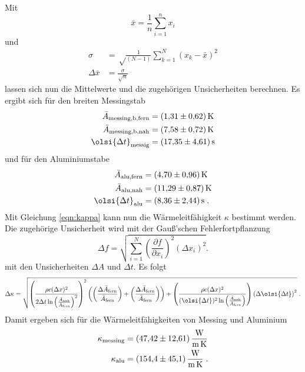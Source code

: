 \noindent
Mit 
\begin{equation}
  \bar{x}=\frac{1}{n}\sum_{i=1}^n{x_i}
  \label{eqn:Mittelwert}
\end{equation}
und 
\begin{align}
  \sigma&=\sqrt\frac{1}{(N-1)}\sum_{k=1}^N\!(x_k-\bar{x})^2 \label{eqn:Standardabweichung}\\
  \Delta\bar{x}&=\frac{\sigma}{\sqrt{n}} \label{eqn:Standardfehler}
\end{align}
lassen sich nun die Mittelwerte und die zugehörigen Unsicherheiten berechnen. Es ergibt sich für den breiten Messingstab
\begin{align*}
  \bar{A}_\text{messing,b,fern} &=\SI{1.31 \pm 0.62}{\kelvin}\\
  \bar{A}_\text{messing,b,nah}  &=\SI{7.58 \pm 0.72}{\kelvin}\\
  \olsi{\Delta t}_\text{messig} &=\SI{17.35\pm 4.61}{\second}\\
\end{align*}
und für den Aluminiumstabe
\begin{align*}
  \bar{A}_\text{alu,fern}       &=\SI{4.70 \pm 0.96}{\kelvin}\\
  \bar{A}_\text{alu,nah}        &=\SI{11.29\pm 0.87}{\kelvin}\\
  \olsi{\Delta t}_\text{alu}    &=\SI{8.36 \pm 2.44}{\second}\;.
\end{align*}
Mit Gleichung \eqref{eqn:kappa} kann nun die Wärmeleitfähigkeit $\kappa$ bestimmt werden. Die zugehörige Unsicherheit wird mit der Gauß'schen
Fehlerfortpflanzung 
\begin{equation}
  \Delta f = \sqrt{\sum_{i=1}^N 
  \left(\frac{\partial f}{\partial x_i}\right)^2
  (\Delta x_i)^2}.
  \label{eqn:GaußFehler}
\end{equation} 
mit den Unsicherheiten $\Delta A$ und $\Delta t$. Es folgt
\begin{equation*}
  \Delta\kappa=\sqrt{
    \left(  \frac{\rho c (\Delta x)^2}{2\Delta t \ln{\left(\frac{\bar{A}_\text{nah}}{\bar{A}_\text{fern}}\right)^2}} \right)^2
    \left(  \left(\frac{\Delta\bar{A}_\text{fern}}{\bar{A}_\text{fern}} \right)
    +\left( \frac{\Delta\bar{A}_\text{fern}}{\bar{A}_\text{fern}}  \right) \right)
    +\left( \frac{\rho c (\Delta x)^2}{(\olsi{\Delta t})^2\ln{\left(\frac{\bar{A}_\text{nah}}{\bar{A}_\text{fern}}\right)}}\right)
    \left(  \Delta\olsi{\Delta t}\right)^2
  }\;.
\end{equation*}
Damit ergeben sich für die Wärmeleitfähigkeiten von Messing und Aluminium
\begin{align*}
  \kappa_\text{messing}&=\SI{47.42\pm 12.61}{\watt\per\metre\per\kelvin}\\
  \kappa_\text{alu}    &=\SI{154.4\pm 45.1}{\watt\per\metre\per\kelvin}  \;.
\end{align*}

